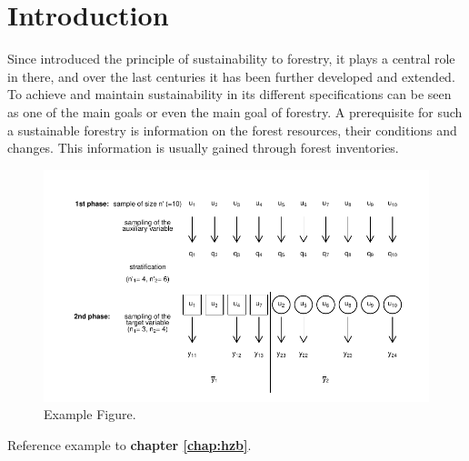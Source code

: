 \chapter{Introduction}
\label{chap:Introduction}
Since \citet{Carlowitz_1713} introduced the principle of sustainability to forestry, it plays a central role in there, and over the last centuries it has been further developed and extended. To achieve and maintain sustainability in its different specifications \citep{Speidel_1984, Schanz_1996} can be seen as one of the main goals or even the main goal of forestry. A prerequisite for such a sustainable forestry is information on the forest resources, their conditions and changes. This information is usually gained through forest inventories.

\begin{figure}
\center
  \includegraphics[width=\textwidth]{Grafiken/Introduction/example.pdf}
\caption{Example Figure.}
\label{fig:Introduction:Floatchart_2st}
\end{figure}

Reference example to \textbf{chapter \ref{chap:hzb}}.

